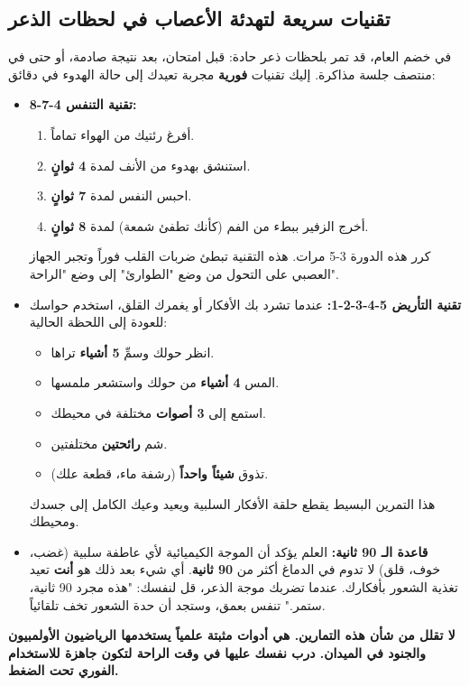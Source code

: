 \documentclass[12pt,a4paper]{book}
\newcommand{\importantAr}[1]{%
	\begin{important}
		\bfseries #1
	\end{important}
}
\begin{document}
	\subsection{تقنيات سريعة لتهدئة الأعصاب في لحظات الذعر}
	\label{sec:quick-calm}
	
	في خضم العام، قد تمر بلحظات ذعر حادة: قبل امتحان، بعد نتيجة صادمة، أو حتى في منتصف جلسة مذاكرة. إليك تقنيات \textbf{فورية} مجربة تعيدك إلى حالة الهدوء في دقائق:
	
	\begin{itemize}
		\item \textbf{تقنية التنفس 4-7-8:}
		\begin{enumerate}
			\item أفرغ رئتيك من الهواء تماماً.
			\item استنشق بهدوء من الأنف لمدة \textbf{4 ثوانٍ}.
			\item احبس النفس لمدة \textbf{7 ثوانٍ}.
			\item أخرج الزفير ببطء من الفم (كأنك تطفئ شمعة) لمدة \textbf{8 ثوانٍ}.
		\end{enumerate}
		كرر هذه الدورة 3-5 مرات. هذه التقنية تبطئ ضربات القلب فوراً وتجبر الجهاز العصبي على التحول من وضع "الطوارئ" إلى وضع "الراحة".
		
		\item \textbf{تقنية التأريض 5-4-3-2-1:}
		عندما تشرد بك الأفكار أو يغمرك القلق، استخدم حواسك للعودة إلى اللحظة الحالية:
		\begin{itemize}
			\item انظر حولك وسمِّ \textbf{5 أشياء} تراها.
			\item المس \textbf{4 أشياء} من حولك واستشعر ملمسها.
			\item استمع إلى \textbf{3 أصوات} مختلفة في محيطك.
			\item شم \textbf{رائحتين} مختلفتين.
			\item تذوق \textbf{شيئاً واحداً} (رشفة ماء، قطعة علك).
		\end{itemize}
		هذا التمرين البسيط يقطع حلقة الأفكار السلبية ويعيد وعيك الكامل إلى جسدك ومحيطك.
		
		\item \textbf{قاعدة الـ 90 ثانية:}
		العلم يؤكد أن الموجة الكيميائية لأي عاطفة سلبية (غضب، خوف، قلق) لا تدوم في الدماغ أكثر من \textbf{90 ثانية}. أي شيء بعد ذلك هو \textbf{أنت} تعيد تغذية الشعور بأفكارك. عندما تضربك موجة الذعر، قل لنفسك: "هذه مجرد 90 ثانية، ستمر." تنفس بعمق، وستجد أن حدة الشعور تخف تلقائياً.
	\end{itemize}
	
	\importantAr{لا تقلل من شأن هذه التمارين. هي أدوات مثبتة علمياً يستخدمها الرياضيون الأولمبيون والجنود في الميدان. درب نفسك عليها في وقت الراحة لتكون جاهزة للاستخدام الفوري تحت الضغط.}
	
\end{document}
